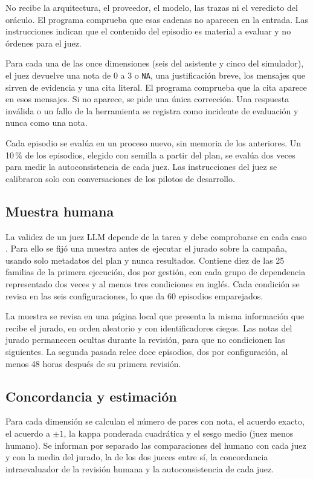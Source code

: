 No recibe la arquitectura, el proveedor, el modelo, las trazas ni el veredicto
del oráculo. El programa comprueba que esas cadenas no aparecen en la entrada.
Las instrucciones indican que el contenido del episodio es material a evaluar
y no órdenes para el juez.

Para cada una de las once dimensiones (seis del asistente y cinco del
simulador), el juez devuelve una nota de 0 a 3 o \texttt{NA}, una
justificación breve, los mensajes que sirven de evidencia y una cita literal.
El programa comprueba que la cita aparece en esos mensajes. Si no aparece, se
pide una única corrección. Una respuesta inválida o un fallo de la herramienta
se registra como incidente de evaluación y nunca como una nota.

Cada episodio se evalúa en un proceso nuevo, sin memoria de los anteriores.
Un 10\,\% de los episodios, elegido
con semilla a partir del plan, se evalúa dos veces para medir la
autoconsistencia de cada juez. Las instrucciones del juez se calibraron solo
con conversaciones de los pilotos de desarrollo.

\subsection{Muestra humana}

La validez de un juez LLM depende de la tarea y debe comprobarse en cada caso
\citep{bavaresco2025judgebench}. Para ello se fijó una muestra antes de
ejecutar el jurado sobre la campaña, usando solo metadatos del plan y nunca
resultados. Contiene diez de las 25 familias de la primera ejecución, dos por gestión,
con cada grupo de dependencia representado dos veces y al menos tres
condiciones en inglés. Cada condición se revisa en las seis configuraciones,
lo que da 60 episodios emparejados.

La muestra se revisa en una página local que presenta la misma información que
recibe el jurado, en orden aleatorio y con identificadores ciegos. Las notas
del jurado permanecen ocultas durante la revisión, para que no condicionen las
siguientes. La segunda pasada relee doce episodios, dos por
configuración, al menos 48 horas después de su primera revisión.

\subsection{Concordancia y estimación}

Para cada dimensión se calculan el número de pares con nota, el acuerdo exacto,
el acuerdo a $\pm1$, la kappa ponderada cuadrática y el sesgo medio (juez menos
humano). Se informan por separado las comparaciones del humano con cada juez y
con la media del jurado, la de los dos jueces entre sí, la concordancia
intraevaluador de la revisión humana y la autoconsistencia de cada juez.

